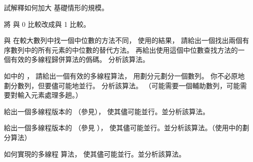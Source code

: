 \startsection[
  title={Multithreaded merge sort},
]

\startEXERCISE
試解釋如何加大  基礎情形的規模。
\stopEXERCISE

\startANSWER
將  與 0 比較改成與 1 比較。
\stopANSWER

\startEXERCISE
與  在較大數列中找一個中位數的方法不同，
使用\inexercise[9.3-8] 的結果，
請給出一個找出兩個有序數列中的所有元素的中位數的替代方法。
再給出使用這個中位數查找方法的一個有效的多線程歸併算法的僞碼。
分析該算法。
\stopEXERCISE

\startANSWER
{}
\stopANSWER

\startEXERCISE[exercise:27.3-3]
如 中的 ，
請給出一個有效的多線程算法，
用劃分元劃分一個數列。
你不必原地劃分數列，但要儘可能地並行。
分析該算法。
（\hint 可能需要一個輔助數列，可能需要對輸入元素處理多趟。）
\stopEXERCISE

\startANSWER
{}
\stopANSWER

\startEXERCISE
給出一個多線程版本的  （參見），
使其儘可能並行。並分析該算法。
\stopEXERCISE

\startANSWER
{}
\stopANSWER

\startEXERCISE\DIFFICULT
給出一個多線程版本的  （參見
），
使其儘可能並行。並分析該算法。（\hint 使用\inexercise[27.3-3] 中的劃分算法）
\stopEXERCISE

\startANSWER
{}
\stopANSWER

\startEXERCISE\DIFFICULT
如何實現 的多線程  算法，
使其儘可能並行。並分析該算法。
\stopEXERCISE

\startANSWER
{}
\stopANSWER

\stopsection
